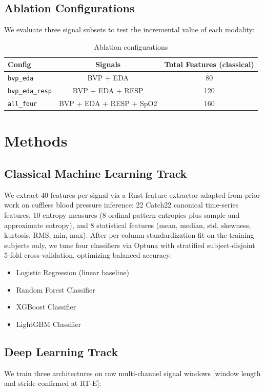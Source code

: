 \documentclass[conference]{IEEEtran}
\begin{document}
\subsection{Ablation Configurations}
We evaluate three signal subsets to test the incremental value of each modality:

\begin{table}[h]
\centering
\caption{Ablation configurations}
\begin{tabular}{lcc}
\toprule
Config & Signals & Total Features (classical) \\
\midrule
\texttt{bvp\_eda} & BVP + EDA & 80 \\
\texttt{bvp\_eda\_resp} & BVP + EDA + RESP & 120 \\
\texttt{all\_four} & BVP + EDA + RESP + SpO2 & 160 \\
\bottomrule
\end{tabular}
\end{table}

\section{Methods}

\subsection{Classical Machine Learning Track}
We extract 40 features per signal via a Rust feature extractor adapted from
prior work on cuffless blood pressure inference: 22 Catch22 canonical
time-series features, 10 entropy measures (8 ordinal-pattern entropies plus
sample and approximate entropy), and 8 statistical features (mean, median,
std, skewness, kurtosis, RMS, min, max). After per-column standardization fit
on the training subjects only, we tune four classifiers via Optuna with
stratified subject-disjoint 5-fold cross-validation, optimizing balanced
accuracy:
\begin{itemize}
  \item Logistic Regression (linear baseline)
  \item Random Forest Classifier
  \item XGBoost Classifier
  \item LightGBM Classifier
\end{itemize}

\subsection{Deep Learning Track}
We train three architectures on raw multi-channel signal windows
[window length and stride confirmed at RT-E]:
\end{document}
